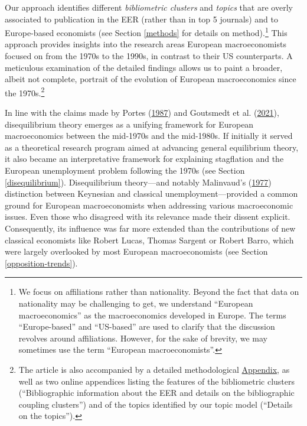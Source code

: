 \documentclass[
  12pt,
  onecolumn]{article}
\begin{document}
Our approach identifies different \emph{bibliometric clusters} and
\emph{topics} that are overly associated to publication in the EER
(rather than in top 5 journals) and to Europe-based economists (see
Section \ref{methods} for details on method).\footnote{We focus on
  affiliations rather than nationality. Beyond the fact that data on
  nationality may be challenging to get, we understand ``European
  macroeconomics'' as the macroeconomics developed in Europe. The terms
  ``Europe-based'' and ``US-based'' are used to clarify that the
  discussion revolves around affiliations. However, for the sake of
  brevity, we may sometimes use the term ``European macroeconomists''.}
This approach provides insights into the research areas European
macroeconomists focused on from the 1970s to the 1990s, in contrast to
their US counterparts. A meticulous examination of the detailed findings
allows us to paint a broader, albeit not complete, portrait of the
evolution of European macroeconomics since the 1970s.\footnote{The
  article is also accompanied by a detailed methodological
  \protect\hyperlink{appendix}{Appendix}, as well as two online
  appendices listing the features of the bibliometric clusters
  (``Bibliographic information about the EER and details on the
  bibliographic coupling clusters'') and of the topics identified by our
  topic model (``Details on the topics'').}

In line with the claims made by Portes
(\protect\hyperlink{ref-portes1987}{1987}) and Goutsmedt et al.
(\protect\hyperlink{ref-goutsmedt2021}{2021}), disequilibrium theory
emerges as a unifying framework for European macroeconomics between the
mid-1970s and the mid-1980s. If initially it served as a theoretical
research program aimed at advancing general equilibrium theory, it also
became an interpretative framework for explaining stagflation and the
European unemployment problem following the 1970s (see Section
\ref{disequilibrium}). Disequilibrium theory---and notably Malinvaud's
(\protect\hyperlink{ref-malinvaud1977}{1977}) distinction between
Keynesian and classical unemployment---provided a common ground for
European macroeconomists when addressing various macroeconomic issues.
Even those who disagreed with its relevance made their dissent explicit.
Consequently, its influence was far more extended than the contributions
of new classical economists like Robert Lucas, Thomas Sargent or Robert
Barro, which were largely overlooked by most European macroeconomists
(see Section \ref{opposition-trends}).
\end{document}
